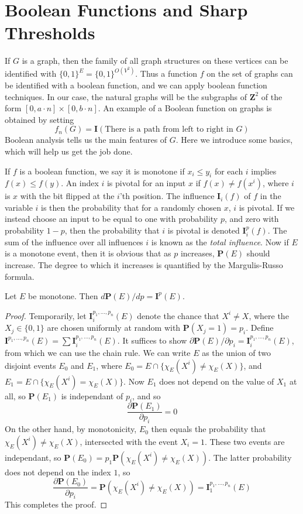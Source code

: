 \section{Boolean Functions and Sharp Thresholds}

If $G$ is a graph, then the family of all graph structures on these vertices can be identified with $\{ 0, 1 \}^E = \{ 0, 1 \}^{O(V^2)}$. Thus a function $f$ on the set of graphs can be identified with a boolean function, and we can apply boolean function techniques. In our case, the natural graphs will be the subgraphs of $\mathbf{Z}^2$ of the form $[0, a \cdot n] \times [0, b \cdot n]$. An example of a Boolean function on graphs is obtained by setting
%
\[ f_n(G) = \mathbf{I}(\text{There is a path from left to right in $G$}) \]
%
Boolean analysis tells us the main features of $G$. Here we introduce some basics, which will help us get the job done.

If $f$ is a boolean function, we say it is monotone if $x_i \leq y_i$ for each $i$ implies $f(x) \leq f(y)$. An index $i$ is pivotal for an input $x$ if $f(x) \neq f(x^i)$, where $i$ is $x$ with the bit flipped at the $i$'th position. The influence $\mathbf{I}_i(f)$ of $f$ in the variable $i$ is then the probability that for a randomly chosen $x$, $i$ is pivotal. If we instead choose an input to be equal to one with probability $p$, and zero with probability $1 - p$, then the probability that $i$ is pivotal is denoted $\mathbf{I}_i^p(f)$. The sum of the influence over all influences $i$ is known as the {\it total influence}. Now if $E$ is a monotone event, then it is obvious that as $p$ increases, $\mathbf{P}(E)$ should increase. The degree to which it increases is quantified by the Margulis-Russo formula.

\begin{theorem}
    Let $E$ be monotone. Then $d\mathbf{P}(E)/dp = \mathbf{I}^p(E)$.
\end{theorem}
\begin{proof}
    Temporarily, let $\mathbf{I}_i^{p_1, \dots, p_n}(E)$ denote the chance that $X^i \neq X$, where the $X_j \in \{ 0, 1 \}$ are chosen uniformly at random with $\mathbf{P}(X_j = 1) = p_i$. Define $\mathbf{I}^{p_1, \dots, p_n}(E) = \sum \mathbf{I}^{p_1, \dots, p_n}_i(E)$. It suffices to show $\partial \mathbf{P}(E) / \partial p_i = \mathbf{I}_i^{p_1,\dots,p_n}(E)$, from which we can use the chain rule. We can write $E$ as the union of two disjoint events $E_0$ and $E_1$, where $E_0 = E \cap \{ \chi_E(X^i) \neq \chi_E(X) \}$, and $E_1 = E \cap \{ \chi_E(X^i) = \chi_E(X) \}$. Now $E_1$ does not depend on the value of $X_1$ at all, so $\mathbf{P}(E_1)$ is independant of $p_i$, and so
    \[ \frac{\partial \mathbf{P}(E_1)}{\partial p_i} = 0 \]
    On the other hand, by monotonicity, $E_0$ then equals the probability that $\chi_E(X^i) \neq \chi_E(X)$, intersected with the event $X_i = 1$. These two events are independant, so $\mathbf{P}(E_0) = p_1 \mathbf{P}(\chi_E(X^i) \neq \chi_E(X))$. The latter probability does not depend on the index $1$, so
    \[ \frac{\partial \mathbf{P}(E_0)}{\partial p_i} = \mathbf{P}(\chi_E(X^i) \neq \chi_E(X)) = \mathbf{I}^{p_1, \dots, p_n}_1(E) \]
    This completes the proof.
\end{proof}

